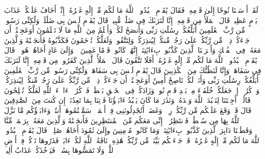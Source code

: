 لَقَدۡ أَرۡسَلۡنَا نُوحًا إِلَىٰ قَوۡمِهِۦ فَقَالَ یَٰقَوۡمِ ٱعۡبُدُوا۟ ٱللَّهَ مَا لَكُم مِّنۡ إِلَٰهٍ غَیۡرُهُۥۤ إِنِّیۤ أَخَافُ عَلَیۡكُمۡ عَذَابَ یَوۡمٍ عَظِیمࣲ%
\stopbuffer%
\startbuffer[\q:7:60]
قَالَ ٱلۡمَلَأُ مِن قَوۡمِهِۦۤ إِنَّا لَنَرَىٰكَ فِی ضَلَٰلࣲ مُّبِینࣲ%
\stopbuffer%
\startbuffer[\q:7:61]
قَالَ یَٰقَوۡمِ لَیۡسَ بِی ضَلَٰلَةࣱ وَلَٰكِنِّی رَسُولࣱ مِّن رَّبِّ ٱلۡعَٰلَمِینَ%
\stopbuffer%
\startbuffer[\q:7:62]
أُبَلِّغُكُمۡ رِسَٰلَٰتِ رَبِّی وَأَنصَحُ لَكُمۡ وَأَعۡلَمُ مِنَ ٱللَّهِ مَا لَا تَعۡلَمُونَ%
\stopbuffer%
\startbuffer[\q:7:63]
أَوَعَجِبۡتُمۡ أَن جَاۤءَكُمۡ ذِكۡرࣱ مِّن رَّبِّكُمۡ عَلَىٰ رَجُلࣲ مِّنكُمۡ لِیُنذِرَكُمۡ وَلِتَتَّقُوا۟ وَلَعَلَّكُمۡ تُرۡحَمُونَ%
\stopbuffer%
\startbuffer[\q:7:64]
فَكَذَّبُوهُ فَأَنجَیۡنَٰهُ وَٱلَّذِینَ مَعَهُۥ فِی ٱلۡفُلۡكِ وَأَغۡرَقۡنَا ٱلَّذِینَ كَذَّبُوا۟ بِءَایَٰتِنَاۤۚ إِنَّهُمۡ كَانُوا۟ قَوۡمًا عَمِینَ%
\stopbuffer%
\startbuffer[\q:7:65]
۞ وَإِلَىٰ عَادٍ أَخَاهُمۡ هُودࣰاۚ قَالَ یَٰقَوۡمِ ٱعۡبُدُوا۟ ٱللَّهَ مَا لَكُم مِّنۡ إِلَٰهٍ غَیۡرُهُۥۤۚ أَفَلَا تَتَّقُونَ%
\stopbuffer%
\startbuffer[\q:7:66]
قَالَ ٱلۡمَلَأُ ٱلَّذِینَ كَفَرُوا۟ مِن قَوۡمِهِۦۤ إِنَّا لَنَرَىٰكَ فِی سَفَاهَةࣲ وَإِنَّا لَنَظُنُّكَ مِنَ ٱلۡكَٰذِبِینَ%
\stopbuffer%
\startbuffer[\q:7:67]
قَالَ یَٰقَوۡمِ لَیۡسَ بِی سَفَاهَةࣱ وَلَٰكِنِّی رَسُولࣱ مِّن رَّبِّ ٱلۡعَٰلَمِینَ%
\stopbuffer%
\startbuffer[\q:7:68]
أُبَلِّغُكُمۡ رِسَٰلَٰتِ رَبِّی وَأَنَا۠ لَكُمۡ نَاصِحٌ أَمِینٌ%
\stopbuffer%
\startbuffer[\q:7:69]
أَوَعَجِبۡتُمۡ أَن جَاۤءَكُمۡ ذِكۡرࣱ مِّن رَّبِّكُمۡ عَلَىٰ رَجُلࣲ مِّنكُمۡ لِیُنذِرَكُمۡۚ وَٱذۡكُرُوۤا۟ إِذۡ جَعَلَكُمۡ خُلَفَاۤءَ مِنۢ بَعۡدِ قَوۡمِ نُوحࣲ وَزَادَكُمۡ فِی ٱلۡخَلۡقِ بَصۜۡطَةࣰۖ فَٱذۡكُرُوۤا۟ ءَالَاۤءَ ٱللَّهِ لَعَلَّكُمۡ تُفۡلِحُونَ%
\stopbuffer%
\startbuffer[\q:7:70]
قَالُوۤا۟ أَجِئۡتَنَا لِنَعۡبُدَ ٱللَّهَ وَحۡدَهُۥ وَنَذَرَ مَا كَانَ یَعۡبُدُ ءَابَاۤؤُنَا فَأۡتِنَا بِمَا تَعِدُنَاۤ إِن كُنتَ مِنَ ٱلصَّٰدِقِینَ%
\stopbuffer%
\startbuffer[\q:7:71]
قَالَ قَدۡ وَقَعَ عَلَیۡكُم مِّن رَّبِّكُمۡ رِجۡسࣱ وَغَضَبٌۖ أَتُجَٰدِلُونَنِی فِیۤ أَسۡمَاۤءࣲ سَمَّیۡتُمُوهَاۤ أَنتُمۡ وَءَابَاۤؤُكُم مَّا نَزَّلَ ٱللَّهُ بِهَا مِن سُلۡطَٰنࣲۚ فَٱنتَظِرُوۤا۟ إِنِّی مَعَكُم مِّنَ ٱلۡمُنتَظِرِینَ%
\stopbuffer%
\startbuffer[\q:7:72]
فَأَنجَیۡنَٰهُ وَٱلَّذِینَ مَعَهُۥ بِرَحۡمَةࣲ مِّنَّا وَقَطَعۡنَا دَابِرَ ٱلَّذِینَ كَذَّبُوا۟ بِءَایَٰتِنَاۖ وَمَا كَانُوا۟ مُؤۡمِنِینَ%
\stopbuffer%
\startbuffer[\q:7:73]
وإِلَىٰ ثَمُودَ أَخَاهُمۡ صَٰلِحࣰاۚ قَالَ یَٰقَوۡمِ ٱعۡبُدُوا۟ ٱللَّهَ مَا لَكُم مِّنۡ إِلَٰهٍ غَیۡرُهُۥۖ قَدۡ جَاۤءَتۡكُم بَیِّنَةࣱ مِّن رَّبِّكُمۡۖ هَٰذِهِۦ نَاقَةُ ٱللَّهِ لَكُمۡ ءَایَةࣰۖ فَذَرُوهَا تَأۡكُلۡ فِیۤ أَرۡضِ ٱللَّهِۖ وَلَا تَمَسُّوهَا بِسُوۤءࣲ فَیَأۡخُذَكُمۡ عَذَابٌ أَلِیمࣱ%
